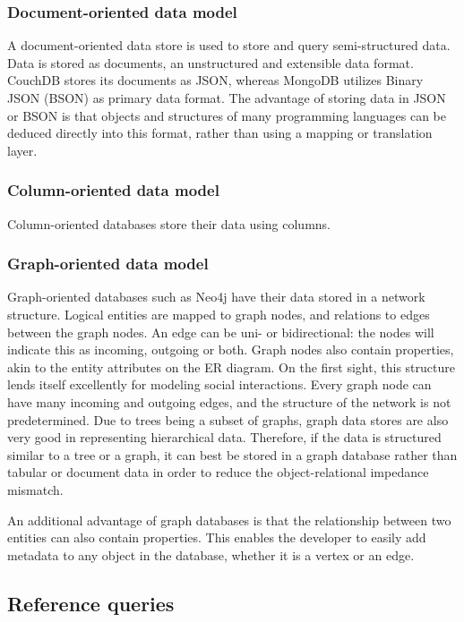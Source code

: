 \subsubsection{Document-oriented data model}
\label{sec:document-data-model}

A document-oriented data store is used to store and query semi-structured data. Data is stored as documents, an unstructured and extensible data format. CouchDB stores its documents as JSON, whereas MongoDB utilizes Binary JSON (BSON) as primary data format. The advantage of storing data in JSON or BSON is that objects and structures of many programming languages can be deduced directly into this format, rather than using a mapping or translation layer.

\subsubsection{Column-oriented data model}
\label{sec:column-data-model}

Column-oriented databases store their data using columns.

\subsubsection{Graph-oriented data model}
\label{sec:graph-data-model}

Graph-oriented databases such as Neo4j have their data stored in a network structure. Logical entities are mapped to graph nodes, and relations to edges between the graph nodes. An edge can be uni- or bidirectional: the nodes will indicate this as incoming, outgoing or both. Graph nodes also contain properties, akin to the entity attributes on the ER diagram.
On the first sight, this structure lends itself excellently for modeling social interactions. Every graph node can have many incoming and outgoing edges, and the structure of the network is not predetermined.
Due to trees being a subset of graphs, graph data stores are also very good in representing hierarchical data. Therefore, if the data is structured similar to a tree or a graph, it can best be stored in a graph database rather than tabular or document data in order to reduce the object-relational impedance mismatch.

An additional advantage of graph databases is that the relationship between two entities can also contain properties. This enables the developer to easily add metadata to any object in the database, whether it is a vertex or an edge.

\subsection{Reference queries}
\label{sec:reference-queries}

